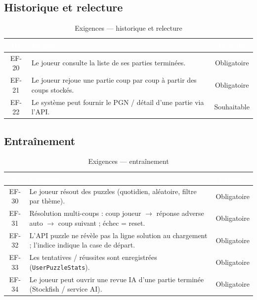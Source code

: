 \documentclass[12pt,a4paper,oneside]{article}
\begin{document}
\subsection{Historique et relecture}
\begin{table}[H]
\centering
\caption{Exigences --- historique et relecture}
\small
\begin{tabularx}{\linewidth}{|c|X|c|}
\hline
\rowcolor{sectionblue}
\textcolor{white}{\textbf{ID}} & \textcolor{white}{\textbf{Exigence}} & \textcolor{white}{\textbf{Priorité}} \\
\hline
EF-20 & Le joueur consulte la liste de ses parties terminées. & Obligatoire \\
\hline
EF-21 & Le joueur rejoue une partie coup par coup à partir des coups stockés. & Obligatoire \\
\hline
EF-22 & Le système peut fournir le PGN / détail d'une partie via l'API. & Souhaitable \\
\hline
\end{tabularx}
\end{table}

\subsection{Entraînement}
\begin{table}[H]
\centering
\caption{Exigences --- entraînement}
\small
\begin{tabularx}{\linewidth}{|c|X|c|}
\hline
\rowcolor{sectionblue}
\textcolor{white}{\textbf{ID}} & \textcolor{white}{\textbf{Exigence}} & \textcolor{white}{\textbf{Priorité}} \\
\hline
EF-30 & Le joueur résout des puzzles (quotidien, aléatoire, filtre par thème). & Obligatoire \\
\hline
EF-31 & Résolution multi-coups : coup joueur $\rightarrow$ réponse adverse auto $\rightarrow$ coup suivant ; échec = reset. & Obligatoire \\
\hline
EF-32 & L'API puzzle ne révèle pas la ligne solution au chargement ; l'indice indique la case de départ. & Obligatoire \\
\hline
EF-33 & Les tentatives / réussites sont enregistrées (\texttt{UserPuzzleStats}). & Obligatoire \\
\hline
EF-34 & Le joueur peut ouvrir une revue IA d'une partie terminée (Stockfish / service AI). & Obligatoire \\
\hline
\end{tabularx}
\end{table}
\end{document}

